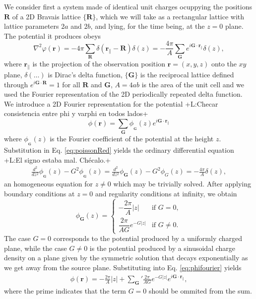 \documentclass{article}
\newcommand{\abs}[1]{\lvert#1\rvert}
\newcommand{\notaL}[1]{{\color{blue}+L:#1+}}
\begin{document}
We consider first a system made of identical unit charges
ocuppying the positions $\bm R$ of a 2D Bravais lattice $\{\bm R\}$,
which we will take as a rectangular lattice with lattice parameters
$2a$ and $2b$, and lying, for the time being, at the $z=0$ plane.
The potential it produces obeys
\begin{equation}
  \label{eq:poissonRed}
  \nabla^2\varphi(\bm r)=-4\pi\sum_{\bm R}\delta(\bm r_\|-\bm
  R)\delta(z)=-\frac{4\pi}{A}\sum_{\bm G}e^{i\bm G\cdot\bm r_\|}\delta(z),
\end{equation}
where $\bm r_\|$ is the projection of the observation position $\bm
r=(x,y,z)$ onto the $xy$ plane,
$\delta(\ldots)$ is Dirac's delta function, $\{\bm G\}$ is the
reciprocal lattice defined through $e^{i\bm G\cdot\bm R}=1$ for all
$\bm R$ and $\bm G$, $A=4ab$ is the area of the unit cell
and we used the Fourier representation of the 2D
periodically repeated delta function. We introduce a 2D Fourier representation for
the potential \notaL{Checar consistencia entre phi y varphi en todos lados}
\begin{equation}
  \label{eq:phifourier}
  \phi(\bm r)=\sum_{\bm G}\phi_{_{\bm G}}(z)e^{i\bm G\cdot\bm r_\|}
\end{equation}
where $\phi_{_{\bm G}}(z)$ is the Fourier coefficient of the potential at
the height $z$. Substitution in Eq. \eqref{eq:poissonRed} yields the
ordinary differential equation \notaL{El signo estaba mal. Chécalo.}
 \begin{eqnarray}
 \frac{d^2}{dz^2}\phi_{_{\bm G}}(z)-G^2\phi_{_{\bm G}}(z)=
 \frac{d^2}{dz^2}\phi_{\bm G}(z)-G^2\phi_G(z)=
   -\frac{4 \pi}{A} \delta(z),
 \end{eqnarray}
an homogeneous equation for $z\ne0$ which may be trivially
solved. After applying boundary conditions at $z=0$ and regularity
conditions at infinity, we obtain
\begin{equation}
  \label{eq:phiG}
  \phi_{\bm G}(z)=
  \begin{cases}
    -\dfrac{2\pi}{A}\abs{z}&\text{if }G=0,\\
    \dfrac{2 \pi}{AG}  e^{- G \abs{z}}&\text{if }G\neq 0.
  \end{cases}
\end{equation}
The case $G=0$ corresponds to the potential produced by a uniformly charged plane,
while the case $G\ne 0$ is the potential produced by a sinusoidal
charge density on a plane given by the
symmetric solution that decays exponentially as we get away from
the source plane. Substituting into Eq. \eqref{eq:phifourier} yields
\begin{eqnarray}
  \label{eq:phiG1}
 \phi(\bm r) = -\frac{2 \pi}{A}  \abs{z} +{\sum_{\bm G}}' \frac{2 \pi
   }{AG} e^{- G \abs{z}} e^{i \bm G\cdot\bm r_\|},
 \end{eqnarray}
where the prime indicates that the term $G=0$ should be ommited from
the sum.
\end{document}
